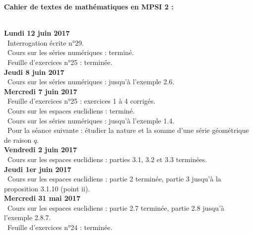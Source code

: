 \documentclass[12pt,a4paper]{article}
\begin{document}
\begin{center}
\Large\bf Cahier de textes de mathématiques en MPSI 2 :
\end{center}
\vspace{1cm}
\vspace{.4cm}\\

\noindent\textbf{Lundi 12 juin 2017}\\
\bu\ Interrogation écrite n°29.\\
\bu\ Cours sur les séries numériques : terminé.\\
\bu\ Feuille d'exercices n°25 : terminée.\vspace{.4cm}\\

\noindent\textbf{Jeudi 8 juin 2017}\\
\bu\ Cours sur les séries numériques : jusqu'à l'exemple 2.6.\vspace{.4cm}\\

\noindent\textbf{Mercredi 7 juin 2017}\\
\bu\ Feuille d'exercices n°25 : exercices 1 à 4 corrigés.\\
\bu\ Cours sur les espaces euclidiens : terminé.\\
\bu\ Cours sur les séries numériques : jusqu'à l'exemple 1.4.\\
\bu\ Pour la séance suivante : étudier la nature et la somme d'une série géométrique de raison $q$.\vspace{.4cm}\\

\noindent\textbf{Vendredi 2 juin 2017}\\
\bu\ Cours sur les espaces euclidiens : parties 3.1, 3.2 et 3.3 terminées.\vspace{.4cm}\\

\noindent\textbf{Jeudi 1er juin 2017}\\
\bu\ Cours sur les espaces euclidiens : partie 2 terminée, partie 3 jusqu'à la proposition 3.1.10 (point ii).\vspace{.4cm}\\

\noindent\textbf{Mercredi 31 mai 2017}\\
\bu\ Cours sur les espaces euclidiens : partie 2.7 terminée, partie 2.8 jusqu'à l'exemple 2.8.7.\\
\bu\ Feuille d'exercices n°24 : terminée.\vspace{.4cm}\\
\end{document}
